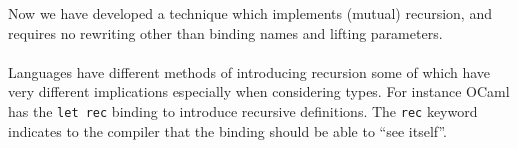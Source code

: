 Now we have developed a technique which implements (mutual) recursion, and requires no rewriting other than binding names and lifting parameters.
\\\\
Languages have different methods of introducing recursion some of which have very different implications especially when considering types.
For instance OCaml has the \texttt{let rec} binding to introduce recursive definitions.
The \texttt{rec} keyword indicates to the compiler that the binding should be able to ``see itself''.


